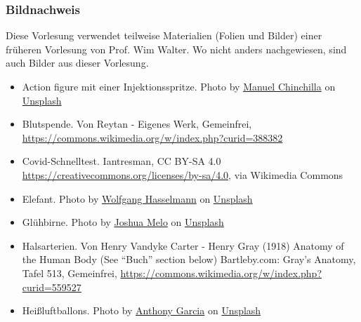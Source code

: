 \documentclass{beamer}
\begin{document}
\begin{frame}
\frametitle{Bildnachweis}
\begin{tiny}
Diese Vorlesung verwendet teilweise Materialien (Folien und Bilder) einer früheren Vorlesung von Prof. Wim Walter.  Wo nicht anders nachgewiesen, sind auch Bilder aus dieser Vorlesung. 
\end{tiny}

\vfill

\begin{tiny}
 
\begin{itemize}

\item
Action figure mit einer Injektionsspritze. Photo by \href{https://unsplash.com/@manuelchinchilla?utm_source=unsplash&utm_medium=referral&utm_content=creditCopyText}{Manuel Chinchilla} on \href{https://unsplash.com/s/photos/injection?utm_source=unsplash&utm_medium=referral&utm_content=creditCopyText}{Unsplash}

\item
Blutspende. Von Reytan - Eigenes Werk, Gemeinfrei, \url{https://commons.wikimedia.org/w/index.php?curid=388382}

\item
Covid-Schnelltest. Iantresman, CC BY-SA 4.0 \url{https://creativecommons.org/licenses/by-sa/4.0}, via Wikimedia Commons
  

\item
Elefant. Photo by \href{https://unsplash.com/@wolfgang_hasselmann?utm_source=unsplash&utm_medium=referral&utm_content=creditCopyText}{Wolfgang Hasselmann} on \href{https://unsplash.com/s/photos/elephant?utm_source=unsplash&utm_medium=referral&utm_content=creditCopyText}{Unsplash}
  
\item
Glühbirne. Photo by \href{https://unsplash.com/@ajoshuamelo?utm_source=unsplash&utm_medium=referral&utm_content=creditCopyText}{Joshua Melo} on \href{https://unsplash.com/s/photos/lightbulb?utm_source=unsplash&utm_medium=referral&utm_content=creditCopyText}{Unsplash}
  

\item
Halsarterien. Von Henry Vandyke Carter - Henry Gray (1918) Anatomy of the Human Body (See ``Buch'' section below) Bartleby.com: Gray's Anatomy, Tafel 513, Gemeinfrei, \url{https://commons.wikimedia.org/w/index.php?curid=559527}

\item
Heißluftballons. Photo by \href{https://unsplash.com/@anthonygarcia?utm_source=unsplash&utm_medium=referral&utm_content=creditCopyText}{Anthony Garcia} on \href{https://unsplash.com/s/photos/air-pressure?utm_source=unsplash&utm_medium=referral&utm_content=creditCopyText}{Unsplash}
  


\end{itemize}
\end{tiny}
\end{frame}
\end{document}
